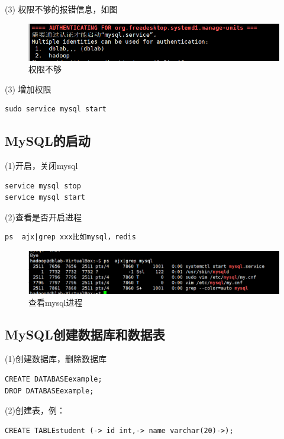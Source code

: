 \documentclass[12pt]{article}
\begin{document}
\newpage

(3) 权限不够的报错信息，如图

\begin{figure}[ht]
\centering
\includegraphics[scale=1.1]{figures/3.png}
\caption{权限不够}\label{fig:label2}
\end{figure}

(3) 增加权限
\begin{lstlisting}[language={[ANSI]C}]
sudo service mysql start
\end{lstlisting}



\subsection{MySQL的启动}

(1)开启，关闭mysql
\begin{lstlisting}[language={[ANSI]C}]
service mysql stop
service mysql start
\end{lstlisting}
(2)查看是否开启进程
\begin{lstlisting}[language={[ANSI]C}]
ps  ajx|grep xxx比如mysql，redis
\end{lstlisting}

\begin{figure}[ht]
\centering
\includegraphics[scale=0.9]{figures/5.png}
\caption{查看mysql进程}\label{fig:label2}
\end{figure}

\subsection{MySQL创建数据库和数据表}
(1)创建数据库，删除数据库
\begin{lstlisting}[language={[ANSI]C}]
CREATE DATABASEexample;
DROP DATABASEexample;
\end{lstlisting}

(2)创建表，例：
\begin{lstlisting}[language={[ANSI]C}]
CREATE TABLEstudent (-> id int,-> name varchar(20)->);
\end{lstlisting}
\end{document}
